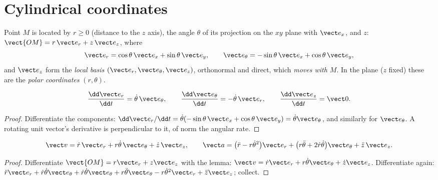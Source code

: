 \section{Cylindrical coordinates}

\begin{definition}\label{def:b1:point-kinematics:cylindrical}
Point $M$ is located by $r \geq 0$ (distance to the $z$ axis), the
angle $\theta$ of its projection on the $xy$ plane with $\vect e_x$,
and $z$: $\vect{OM} = r\,\vect e_r + z\,\vect e_z$, where
\[
\vect e_r = \cos\theta\,\vect e_x + \sin\theta\,\vect e_y, \qquad
\vect e_\theta = -\sin\theta\,\vect e_x + \cos\theta\,\vect e_y,
\]
and $\vect e_z$ form the \emph{local basis} $(\vect e_r, \vect e_\theta,
\vect e_z)$, orthonormal and direct, which \emph{moves with $M$}. In the
plane ($z$ fixed) these are the \emph{polar coordinates} $(r, \theta)$.
\end{definition}

\begin{lemma}\label{lem:b1:point-kinematics:basisderiv}
\[
\frac{\dd\vect e_r}{\dd t} = \dot\theta\,\vect e_\theta, \qquad
\frac{\dd\vect e_\theta}{\dd t} = -\dot\theta\,\vect e_r, \qquad
\frac{\dd\vect e_z}{\dd t} = \vect 0 .
\]
\end{lemma}

\begin{proof}
Differentiate the components: $\dd\vect e_r/\dd t = \dot\theta(-\sin\theta\,
\vect e_x + \cos\theta\,\vect e_y) = \dot\theta\vect e_\theta$, and
similarly for $\vect e_\theta$. A rotating unit vector's derivative is
perpendicular to it, of norm the angular rate.
\end{proof}

\begin{theorem}\label{thm:b1:point-kinematics:cylindrical}
\[
\vect v = \dot r\,\vect e_r + r\dot\theta\,\vect e_\theta + \dot z\,\vect e_z,
\qquad
\vect a = \big(\ddot r - r\dot\theta^2\big)\vect e_r
+ \big(r\ddot\theta + 2\dot r\dot\theta\big)\vect e_\theta + \ddot z\,\vect e_z .
\]
\end{theorem}

\begin{proof}
Differentiate $\vect{OM} = r\vect e_r + z\vect e_z$ with the lemma:
$\vect v = \dot r\vect e_r + r\dot\theta\vect e_\theta + \dot z\vect e_z$.
Differentiate again: $\ddot r\vect e_r + \dot r\dot\theta\vect e_\theta +
\dot r\dot\theta\vect e_\theta + r\ddot\theta\vect e_\theta - r\dot\theta^2
\vect e_r + \ddot z\vect e_z$; collect.
\end{proof}

